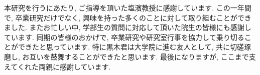 \documentclass[a4j,12pt]{jarticle}
\begin{document}
本研究を行うにあたり, ご指導を頂いた塩濱教授に感謝しています. この一年間で, 卒業研究だけでなく, 興味を持った多くのことに対して取り組むことができました. またお忙しい中, 学部生の質問に対応して頂いた院生の皆様にも感謝しています. 同期の皆様のおかげで, 卒業研究や研究室行事を協力して乗り切ることができたと思っています. 特に黒木君は大学院に進む友人として, 共に切磋琢磨し, お互いを鼓舞することができたと思います. 最後になりますが, ここまで支えてくれた両親に感謝しています.

\newpage
{} %

%


\end{document}
